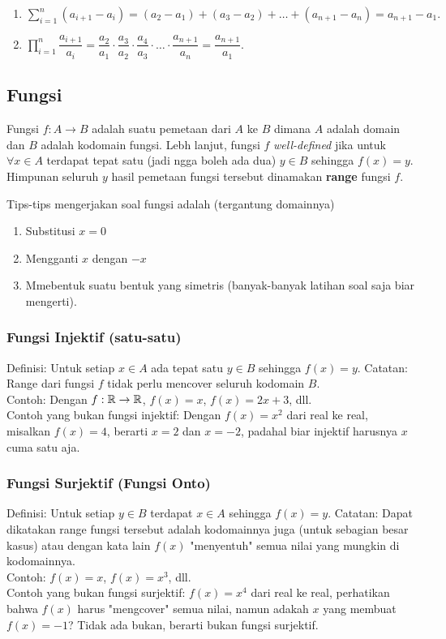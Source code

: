     \begin{enumerate}
        \item $\sum_{i=1}^{n} (a_{i+1}-a_{i}) = (a_2-a_1)+(a_3-a_2)+\dots+(a_{n+1}-a_{n}) = a_{n+1}-a_1.$
        \item $\prod_{i=1}^{n} \dfrac{a_{i+1}}{a_i} =  \dfrac{a_2}{a_1}\cdot\dfrac{a_3}{a_2}\cdot\dfrac{a_4}{a_3}\cdot\ldots\cdot\dfrac{a_{n+1}}{a_n} = \dfrac{a_{n+1}}{a_1}.$
    \end{enumerate}
    
    \subsection{Fungsi}
    Fungsi $f : A \rightarrow B$ adalah suatu pemetaan dari $A$ ke $B$ dimana $A$ adalah domain dan $B$ adalah kodomain fungsi. Lebh lanjut, fungsi $f$ \textit{well-defined} jika untuk $\forall x \in A$ terdapat tepat satu (jadi ngga boleh ada dua) $y \in B$ sehingga $f(x)=y$. Himpunan seluruh $y$ hasil pemetaan fungsi tersebut dinamakan \textbf{range} fungsi $f$.
    
    Tips-tips mengerjakan soal fungsi adalah (tergantung domainnya)
    \begin{enumerate}
    \item Substitusi $x=0$
    \item Mengganti $x$ dengan $-x$
    \item Mmebentuk suatu bentuk yang simetris (banyak-banyak latihan soal saja biar mengerti).
    \end{enumerate}
    
    \subsubsection{Fungsi Injektif (satu-satu)}
    Definisi: Untuk setiap $x \in A$ ada tepat satu $y \in B$ sehingga $f(x)=y$. 
    Catatan: Range dari fungsi $f$ tidak perlu mencover seluruh kodomain $B$.\\
    Contoh: Dengan $f: \mathbb R \rightarrow \mathbb R$, $f(x)=x$, $f(x)=2x+3$, dll.\\ 
    Contoh yang bukan fungsi injektif: Dengan $f(x)=x^2$ dari real ke real, misalkan $f(x)=4$, berarti $x=2$ dan $x=-2$, padahal biar injektif harusnya $x$ cuma satu aja.
    
    \subsubsection{Fungsi Surjektif (Fungsi Onto)}
    Definisi: Untuk setiap $y \in B$ terdapat $x \in A$ sehingga $f(x)=y$. 
    Catatan: Dapat dikatakan range fungsi tersebut adalah kodomainnya juga (untuk sebagian besar kasus) atau dengan kata lain $f(x)$ "menyentuh" semua nilai yang mungkin di kodomainnya. \\
    Contoh: $f(x)=x$, $f(x)=x^3$, dll.\\
    Contoh yang bukan fungsi surjektif: $f(x)=x^4$ dari real ke real, perhatikan bahwa $f(x)$ harus "mengcover" semua nilai, namun adakah $x$ yang membuat $f(x)=-1$? Tidak ada bukan, berarti bukan fungsi surjektif.
    
